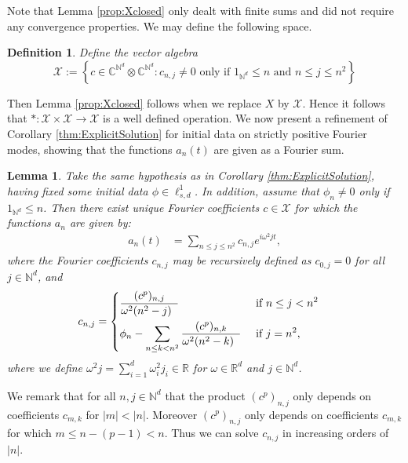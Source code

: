 \documentclass{article}
\newtheorem{lemma}[theorem]{Lemma}
\newtheorem{definition}[theorem]{Definition}
\newcommand{\R}{\mathbb{R}}
\newcommand{\C}{\mathbb{C}}
\newcommand{\N}{\mathbb{N}}
\newcommand{\cX}{\mathcal{X}}
\begin{document}
 
 Note that  Lemma \ref{prop:Xclosed} only dealt with finite sums and did not require any convergence properties. We may define the following space. 
  \begin{definition}
 	Define the vector algebra  
 	\[
 	\cX := \left\{ 
 	c \in \C^{\N^d} \otimes \C^{\N^d} : c_{n,j} \neq  0 \mbox{ only if } 1_{\N^d} \leq n \mbox{ and }  n \leq j \leq n^2
 	\right\}
 	\] 
 \end{definition}
Then Lemma \ref{prop:Xclosed} follows when we replace $ X $ by $ \cX$. Hence it follows that $ *: \cX \times \cX\to \cX$  is a well defined operation.   
We now present a refinement of Corollary \ref{thm:ExplicitSolution} for initial data on strictly positive Fourier modes, showing that the functions  $a_n(t)$ are given as a Fourier sum. 




\begin{lemma}  \label{prop:FF_Recursive}
	Take the same hypothesis as in Corollary \ref{thm:ExplicitSolution}, having fixed some initial data $ \phi \in \ell^1_{s,d}$. In addition, assume that   $\phi_{n} \neq  0 $ only if $ 1_{\N^d} \leq n$.  Then there exist unique Fourier coefficients $c \in \cX$ for which    the functions $a_n$  are given by:
	\begin{align} \label{eq:PeriodicCoefficients}
	a_n(t) 
	&=
	\sum_{n \leq j \leq n^2} 
	c_{n,j} e^{i \omega^2 j t},
	\end{align}
	where the Fourier coefficients $ c_{n,j}$ may be recursively defined as $c_{0,j} = 0$ for all $ j \in \N^d$, and 
\begin{align} 
	c_{n,j} &= 
	\begin{dcases} 
		\frac{(c^p)_{n,j} }{		\omega^{2}(n^2-j) \;\;}
		& \mbox{ if } n\leq j<n^2  \\
		\phi_n -
		\sum_{n \leq k < n^2} \frac{(c^p)_{n,k} }{		\omega^{2}(n^2-k) \;\;}
		& \mbox{ if } j = n^2 ,
	\end{dcases}
\label{eq:FF_Recursive}
\end{align}
where  we define  $ \omega^2 j = \sum_{i=1}^d \omega_i^2 j_i  \in \R$  for $ \omega \in \R^d$ and $ j \in \N^d$. 

\end{lemma}

We remark that for all $n,j\in \N^d$ that the product  $(c^p)_{n,j}$ only depends on coefficients $c_{m,k}$ for $|m| < |n|$.  Moreover $(c^p)_{n,j}$   only depends on coefficients $ c_{m,k}$ for which $ m \leq n - (p-1) < n$. 
Thus  we can solve $c_{n,j}$ in  increasing orders of $|n|$. 
\end{document}
